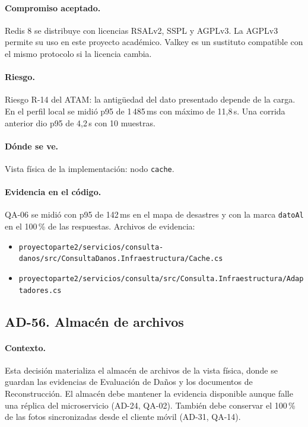 \paragraph{Compromiso aceptado.} Redis 8 se distribuye con licencias RSALv2, SSPL y AGPLv3.
La AGPLv3 permite su uso en este proyecto académico.
Valkey es un sustituto compatible con el mismo protocolo si la licencia cambia.

\paragraph{Riesgo.} Riesgo R-14 del ATAM: la antigüedad del dato presentado depende de la carga.
En el perfil local se midió p95 de 1\,485\,ms con máximo de 11,8\,s.
Una corrida anterior dio p95 de 4,2\,s con 10 muestras.

\paragraph{Dónde se ve.} Vista física de la implementación: nodo \texttt{cache}.

\paragraph{Evidencia en el código.} QA-06 se midió con p95 de 142\,ms en el mapa de desastres y con la marca \texttt{datoAl} en el 100\,\% de las respuestas.
Archivos de evidencia:
{\raggedright
\begin{itemize}
  \item \texttt{proyectoparte2/\br{}servicios/\br{}consulta-danos/\br{}src/\br{}ConsultaDanos.Infraestructura/\br{}Cache.cs}
  \item \texttt{proyectoparte2/\br{}servicios/\br{}consulta/\br{}src/\br{}Consulta.Infraestructura/\br{}Adaptadores.cs}
\end{itemize}
\par}

\subsection{AD-56. Almacén de archivos}
\label{sec:tec-ad56}

\paragraph{Contexto.} Esta decisión materializa el almacén de archivos de la vista física, donde se guardan las evidencias de Evaluación de Daños y los documentos de Reconstrucción.
El almacén debe mantener la evidencia disponible aunque falle una réplica del microservicio (AD-24, QA-02).
También debe conservar el 100\,\% de las fotos sincronizadas desde el cliente móvil (AD-31, QA-14).

